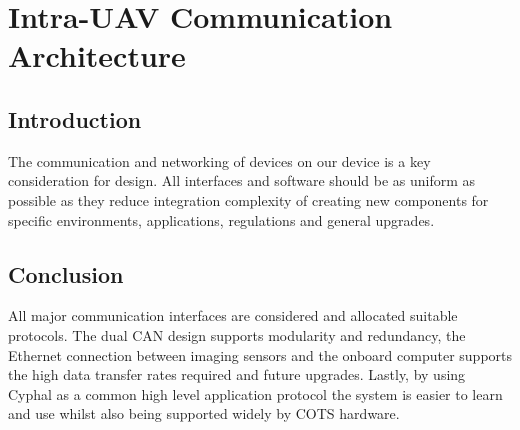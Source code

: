 \newpage
{}
\section{Intra-UAV Communication Architecture} \label{Intra Communication}

\subsection{Introduction}\label{sub_section:tgt_intra_com_intro}
The communication and networking of devices on our device is a key consideration for design. All interfaces and software should be as uniform as possible as they reduce integration complexity of creating new components for specific environments, applications, regulations and general upgrades.



\subsection{Conclusion}
All major communication interfaces are considered and allocated suitable protocols. The dual \gls{CAN} design supports modularity and redundancy, the Ethernet connection between imaging sensors and the onboard computer supports the high data transfer rates required and future upgrades. Lastly, by using Cyphal as a common high level application protocol the system is easier to learn and use whilst also being supported widely by \gls{COTS} hardware.